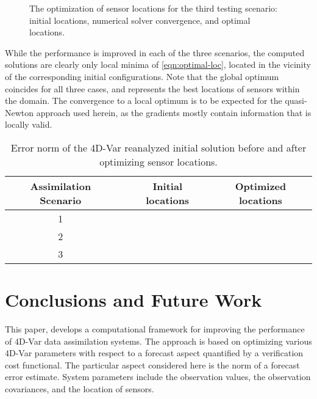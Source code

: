 \documentclass{article}
\begin{document}
\begin{figure}
\setcounter{subfigure}{0}
\centering
 \caption{The optimization of sensor locations for the third testing scenario: initial locations, numerical solver convergence, and optimal locations.}
 \label{fig:optobs_OBSLOC}
\end{figure}


While the performance is improved in each of the three scenarios, the computed solutions 
are clearly only local minima of \eqref{eqn:optimal-loc}, located in the vicinity of the corresponding
initial configurations. Note that the global optimum coincides for all three cases, and represents the best
locations of  sensors within the domain.
The convergence to a local optimum is to be expected for the quasi-Newton
approach used herein, as the gradients mostly contain information that is locally valid.






\begin{table}
\caption{Error norm of the 4D-Var reanalyzed initial solution before and after optimizing sensor locations.}
\centering
{
\footnotesize
\begin{tabular}{|c|c||c|c|}
  \hline
  Assimilation Scenario & &  Initial locations & Optimized locations \\
 \hline\hline
1 &  &  & \\
 \cline{1-1} \cline{3-4}
2 &  &  & \\
 \cline{1-1} \cline{3-4}
3 &  &   & \\
 \hline
\end{tabular}
}
\label{Table:obsopt_gain3}
\end{table}




\section{Conclusions and Future Work}\label{sec:optobs_concl}


This paper, develops a computational framework for improving the performance of
4D-Var data assimilation systems. The approach is based on
optimizing various  4D-Var parameters with respect to a forecast aspect quantified by 
a verification cost functional. The particular aspect considered here is the norm of a forecast error
estimate. System parameters include the observation values, the observation covariances, and the location of
sensors.
\end{document}
